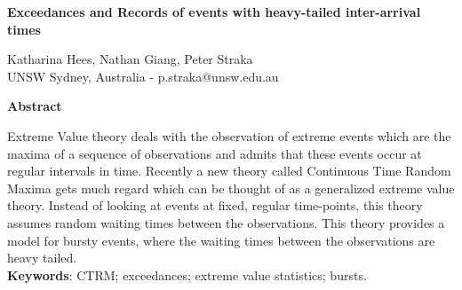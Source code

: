 \documentclass[12pt]{article}
\newcommand{\1}{\mathbf 1}
\begin{document}
\small{

\begin{center}
\textbf{Exceedances and Records of events with heavy-tailed inter-arrival times}
\end{center}



\begin{center}
{Katharina Hees, Nathan Giang, Peter Straka}\\
{UNSW Sydney, Australia - p.straka@unsw.edu.au}\\ 
\vspace{0.5cm}


\end{center}

\begin{center}
{\bf Abstract}
\end{center}

\setlength{\parindent}{0pt}
Extreme Value theory deals with the observation of extreme events which are the maxima of a sequence of observations and admits that these events occur at regular intervals in time. Recently a new theory called Continuous Time Random Maxima gets much regard which can be thought of as a generalized extreme value theory. Instead of looking at events at fixed, regular time-points, this theory assumes random waiting times between the observations. This theory provides a model for bursty events, where the waiting times between the observations are heavy tailed.\\



{\bf Keywords}: CTRM; exceedances; extreme value statistics; bursts.
}\\


\setlength{\parindent}{0pt}
\end{document}
